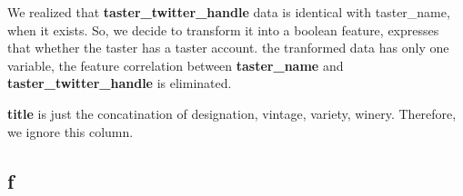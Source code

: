 \documentclass[11pt]{article}
\begin{document}
We realized that \textbf{taster_twitter_handle} data is identical with taster_name, when it exists. So, we decide to transform it into a boolean feature, expresses that whether the taster has a taster account. the tranformed data has only one variable, the feature correlation between \textbf{taster_name} and \textbf{taster_twitter_handle} is eliminated.

\textbf{title} is just the concatination of designation, vintage, variety, winery. Therefore, we ignore this column.

\subsection{f}



\end{document}
